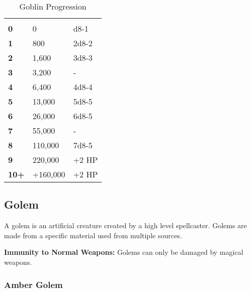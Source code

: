 \begin{multicols*}{2}

\begin {table}[H]
  \caption{Goblin Progression}
  \begin{tabularx}{\columnwidth}{>{\bfseries}YYY}
	 &  & \\
	0 & 0 & d8-1\\
	1 & 800 & 2d8-2\\
	2 & 1,600 & 3d8-3\\
	3 & 3,200 & -\\
	4 & 6,400 & 4d8-4\\
	5 & 13,000 & 5d8-5\\
	6 & 26,000 & 6d8-5\\
	7 & 55,000 & -\\
	8 & 110,000 & 7d8-5\\
	9 & 220,000 & +2 HP\\
	10+ & +160,000 & +2 HP
  \end {tabularx}
\end {table}

\subsection{Golem}
A golem is an artificial creature created by a high level spellcaster. Golems are made from a specific material used from multiple sources.

\textbf{Immunity to Normal Weapons:} Golems can only be damaged by magical weapons.

\subsubsection{Amber Golem}
\end{multicols*}
